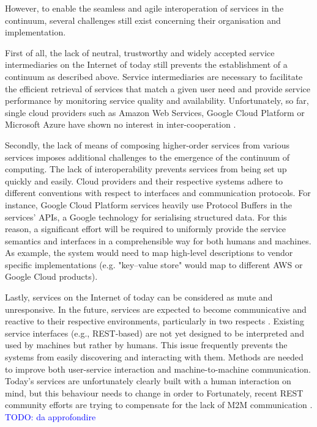 However, to enable the seamless and agile interoperation of services in the continuum, several challenges still exist concerning their organisation and implementation.

First of all, the lack of neutral, trustworthy and widely accepted service intermediaries on the Internet of today still prevents the establishment of a continuum as described above. Service intermediaries are necessary to facilitate the efficient retrieval of services that match a given user need and provide service performance by monitoring service quality and availability. Unfortunately, so far, single cloud providers such as Amazon Web Services, Google Cloud Platform or Microsoft Azure have shown no interest in inter-cooperation \cite{inter-cloud}.

Secondly, the lack of means of composing higher-order services from various services imposes additional challenges to the emergence of the continuum of computing. The lack of interoperability prevents services from being set up quickly and easily. Cloud providers and their respective systems adhere to different conventions with respect to interfaces and communication protocols. For instance, Google Cloud Platform services heavily use Protocol Buffers \cite{protobuf} in the services' APIs, a Google technology for serialising structured data. For this reason, a significant effort will be required to uniformly provide the service semantics and interfaces in a comprehensible way for both humans and machines. As example, the system would need to map high-level descriptions to vendor specific implementations (e.g. "key–value store" would map to different AWS or Google Cloud products).

Lastly, services on the Internet of today can be considered as mute and unresponsive. In the future, services are expected to become communicative and reactive to their respective environments, particularly in two respects \cite{iot-enterprise}. Existing service interfaces (e.g., REST-based) are not yet designed to be interpreted and used by machines but rather by humans. This issue frequently prevents the systems from easily discovering and interacting with them. Methods are needed to improve both user-service interaction and machine-to-machine communication. Today's services are unfortunately clearly built with a human interaction on mind, but this behaviour needs to change in order to  Fortunately, recent REST community efforts are trying to compensate for the lack of M2M communication \cite{openapi}. \textcolor{blue}{TODO: da approfondire}

